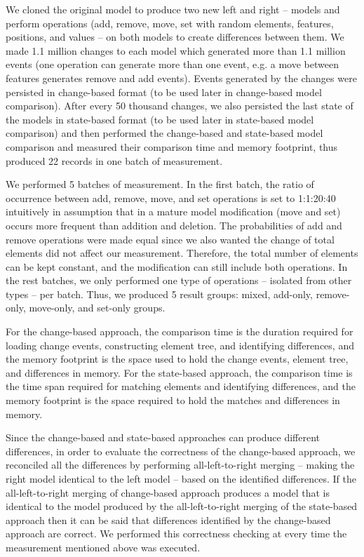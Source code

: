 \documentclass{jot}
\begin{document}
We cloned the original model to produce two new left and right -- models and perform operations (\textsf{add}, \textsf{remove}, \textsf{move}, \textsf{set} with random elements, features, positions, and values -- on both models to create differences between them. We made 1.1 million changes to each model which generated more than 1.1 million events (one operation can generate more than one event, e.g. a \textsf{move} between features generates \textsf{remove} and \textsf{add} events). Events generated by the changes were persisted in change-based format (to be used later in change-based model comparison). After every 50 thousand changes, we also persisted the last state of the models in state-based format (to be used later in state-based model comparison) and then performed the change-based and state-based model comparison and measured their comparison time and memory footprint, thus produced 22 records in one batch of measurement. 

We performed 5 batches of measurement. In the first batch, the ratio of occurrence between \textsf{add}, \textsf{remove}, \textsf{move}, and \textsf{set} operations is set to 1:1:20:40 intuitively in assumption that in a mature model modification (\textsf{move} and \textsf{set}) occurs more frequent than addition and deletion. The probabilities of \textsf{add} and \textsf{remove} operations were made equal since we also wanted the change of total elements did not affect our measurement. Therefore, the total number of elements can be kept constant, and the modification can still include both operations. In the rest batches, we only performed one type of operations -- isolated from other types -- per batch. Thus, we produced 5 result groups: mixed, add-only, remove-only, move-only, and set-only groups.

For the change-based approach, the comparison time is the duration required for loading change events, constructing element tree, and identifying differences, and the memory footprint is the space used to hold the change events, element tree, and differences in memory. For the state-based approach, the comparison time is the time span required for matching elements and identifying differences, and the memory footprint is the space required to hold the matches and differences in memory.

Since the change-based and state-based approaches can produce different differences, in order to evaluate the correctness of the change-based approach, we reconciled all the differences by performing all-left-to-right merging -- making the right model identical to the left model -- based on the identified differences. If the all-left-to-right merging of change-based approach produces a model that is identical to the model produced by the all-left-to-right merging of the state-based approach then it can be said that differences identified by the change-based approach are correct. We performed this correctness checking at every time the measurement mentioned above was executed.
\end{document}
